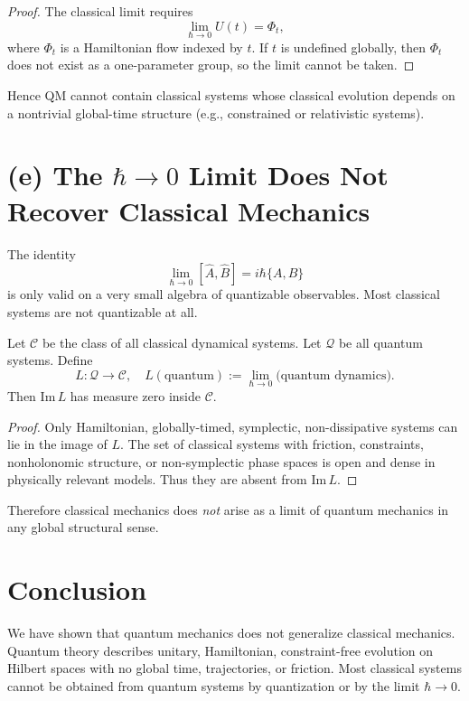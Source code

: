 \documentclass[12pt]{article}
\begin{document}
\begin{proof}
The classical limit requires
\[
\lim_{\hbar \to 0} U(t) = \Phi_t,
\]
where $\Phi_t$ is a Hamiltonian flow indexed by $t$.  
If $t$ is undefined globally, then $\Phi_t$ does not exist as a one-parameter group, so the limit cannot be taken.
\end{proof}

Hence QM cannot contain classical systems whose classical evolution depends on a nontrivial global-time structure (e.g., constrained or relativistic systems).


\section{(e) The $\hbar\to 0$ Limit Does Not Recover Classical Mechanics}

The identity
\[
\lim_{\hbar\to 0} [\hat A, \hat B] = i\hbar \{A,B\}
\]
is only valid on a very small algebra of quantizable observables.  
Most classical systems are not quantizable at all.

\begin{theorem}
Let $\mathcal{C}$ be the class of all classical dynamical systems.  
Let $\mathcal{Q}$ be all quantum systems.  
Define
\[
L: \mathcal{Q} \to \mathcal{C},\quad 
L(\text{quantum}) := \lim_{\hbar\to 0} \text{(quantum dynamics)}.
\]
Then $\mathrm{Im}\,L$ has measure zero inside $\mathcal{C}$.
\end{theorem}

\begin{proof}
Only Hamiltonian, globally-timed, symplectic, non-dissipative systems can lie in the image of $L$.
The set of classical systems with friction, constraints, nonholonomic structure, or non-symplectic phase spaces is open and dense in physically relevant models.
Thus they are absent from $\mathrm{Im}\,L$.
\end{proof}

Therefore classical mechanics does \emph{not} arise as a limit of quantum mechanics in any global structural sense.


\section{Conclusion}

We have shown that quantum mechanics does not generalize classical mechanics.  
Quantum theory describes unitary, Hamiltonian, constraint-free evolution on Hilbert spaces with no global time, trajectories, or friction.  
Most classical systems cannot be obtained from quantum systems by quantization or by the limit $\hbar\to 0$.
\end{document}

